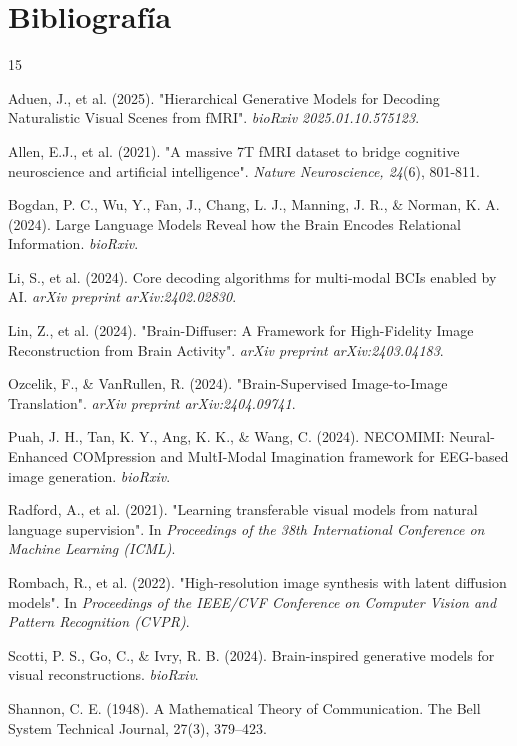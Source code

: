 \documentclass{article}
\begin{document}
\section*{Bibliografía}
\begin{thebibliography}{15}
    \small 

     Aduen, J., et al. (2025). "Hierarchical Generative Models for Decoding Naturalistic Visual Scenes from fMRI". \textit{bioRxiv 2025.01.10.575123}.

     Allen, E.J., et al. (2021). "A massive 7T fMRI dataset to bridge cognitive neuroscience and artificial intelligence". \textit{Nature Neuroscience, 24}(6), 801-811.

     Bogdan, P. C., Wu, Y., Fan, J., Chang, L. J., Manning, J. R., \& Norman, K. A. (2024). Large Language Models Reveal how the Brain Encodes Relational Information. \textit{bioRxiv}.

     Li, S., et al. (2024). Core decoding algorithms for multi-modal BCIs enabled by AI. \textit{arXiv preprint arXiv:2402.02830}.

     Lin, Z., et al. (2024). "Brain-Diffuser: A Framework for High-Fidelity Image Reconstruction from Brain Activity". \textit{arXiv preprint arXiv:2403.04183}.

     Ozcelik, F., \& VanRullen, R. (2024). "Brain-Supervised Image-to-Image Translation". \textit{arXiv preprint arXiv:2404.09741}.

     Puah, J. H., Tan, K. Y., Ang, K. K., \& Wang, C. (2024). NECOMIMI: Neural-Enhanced COMpression and MultI-Modal Imagination framework for EEG-based image generation. \textit{bioRxiv}.

     Radford, A., et al. (2021). "Learning transferable visual models from natural language supervision". In \textit{Proceedings of the 38th International Conference on Machine Learning (ICML)}.

     Rombach, R., et al. (2022). "High-resolution image synthesis with latent diffusion models". In \textit{Proceedings of the IEEE/CVF Conference on Computer Vision and Pattern Recognition (CVPR)}.

     Scotti, P. S., Go, C., \& Ivry, R. B. (2024). Brain-inspired generative models for visual reconstructions. \textit{bioRxiv}.

     Shannon, C. E. (1948). A Mathematical Theory of Communication. The Bell System Technical Journal, 27(3), 379–423.
    

\end{thebibliography}
\end{document}
